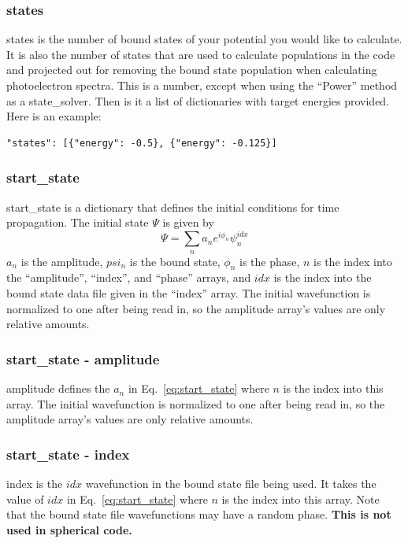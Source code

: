 \documentclass{article}
\begin{document}
\subsubsection{states}
states is the number of bound states of your potential you would like to calculate. It is also the number of states that are used to calculate populations in the code and projected out for removing the bound state population when calculating photoelectron spectra. This is a number, except when using the ``Power'' method as a state\_solver. Then is it a list of dictionaries with target energies provided. Here is an example:
\begin{verbatim}
"states": [{"energy": -0.5}, {"energy": -0.125}]
\end{verbatim}

\subsubsection{start\_state}
start\_state is a dictionary that defines the initial conditions for time propagation. The initial state $\Psi$ is given by
\begin{equation}
  \Psi = \sum\limits_n a_n e^{i\phi_n} \psi_n^{idx}
  \label{eq:start_state}
\end{equation}
$a_n$ is the amplitude, $psi_n$ is the bound state, $\phi_n$ is the phase, $n$ is the index into the ``amplitude'', ``index'', and ``phase'' arrays, and $idx$ is the index into the bound state data file given in the ``index'' array. The initial wavefunction is normalized to one after being read in, so the amplitude array's values are only relative amounts.

\subsubsection{start\_state - amplitude}
amplitude defines the $a_n$ in Eq.~\ref{eq:start_state} where $n$ is the index into this array. The initial wavefunction is normalized to one after being read in, so the amplitude array's values are only relative amounts.

\subsubsection{start\_state - index}
index is the $idx$ wavefunction in the bound state file being used. It takes the value of $idx$ in Eq.~\ref{eq:start_state} where $n$ is the index into this array. Note that the bound state file wavefunctions may have a random phase. \textbf{This is not used in spherical code.}
\end{document}

